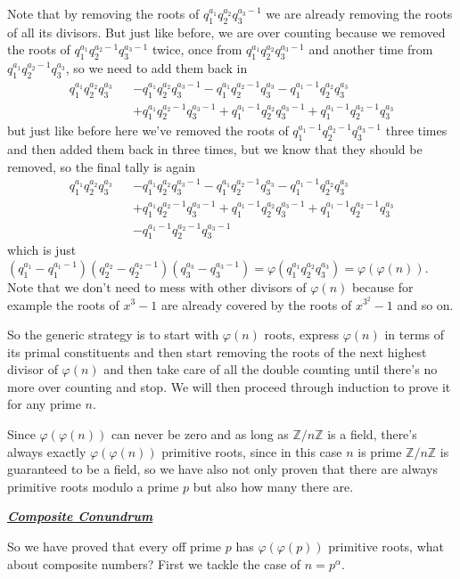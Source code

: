\documentclass[aps,preprint,preprintnumbers,nofootinbib,showpacs,prd]{revtex4-1}
\newcommand{\nbea}{\begin{eqnarray*}}
\newcommand{\neea}{\end{eqnarray*}}
\begin{document}
Note that by removing the roots of $q_1^{a_1}q_2^{a_2}q_3^{a_3-1}$ we are already removing the roots of all its divisors. But just like before, we are over counting because we removed the roots of $q_1^{a_1}q_2^{a_2-1}q_3^{a_3-1}$ twice, once from $q_1^{a_1}q_2^{a_2}q_3^{a_3-1}$ and another time from $q_1^{a_1}q_2^{a_2-1}q_3^{a_3}$, so we need to add them back in
%
\nbea
q_1^{a_1}q_2^{a_2}q_3^{a_3} &&  - q_1^{a_1}q_2^{a_2}q_3^{a_3-1} - q_1^{a_1}q_2^{a_2-1}q_3^{a_3}- q_1^{a_1-1}q_2^{a_2}q_3^{a_3} \\
&& + q_1^{a_1}q_2^{a_2-1}q_3^{a_3-1} + q_1^{a_1-1}q_2^{a_2}q_3^{a_3-1} + q_1^{a_1-1}q_2^{a_2-1}q_3^{a_3}
\neea
%
but just like before here we've removed the roots of $q_1^{a_1-1}q_2^{a_2-1}q_3^{a_3-1}$ three times and then added them back in three times, but we know that they should be removed, so the final tally is again
%
\nbea
q_1^{a_1}q_2^{a_2}q_3^{a_3} &&  - q_1^{a_1}q_2^{a_2}q_3^{a_3-1} - q_1^{a_1}q_2^{a_2-1}q_3^{a_3}- q_1^{a_1-1}q_2^{a_2}q_3^{a_3} \\
&& + q_1^{a_1}q_2^{a_2-1}q_3^{a_3-1} + q_1^{a_1-1}q_2^{a_2}q_3^{a_3-1} + q_1^{a_1-1}q_2^{a_2-1}q_3^{a_3} \\
&& -q_1^{a_1-1}q_2^{a_2-1}q_3^{a_3-1}
\neea
%
which is just $(q_1^{a_1} - q_1^{a_1-1})(q_2^{a_2}-q_2^{a_2-1})(q_3^{a_3} - q_3^{a_3-1}) =\varphi(q_1^{a_1}q_2^{a_2}q_3^{a_3}) = \varphi(\varphi(n))$. Note that we don't need to mess with other divisors of $\varphi(n)$ because for example the roots of $x^3 - 1$ are already covered by the roots of $x^{3^2} - 1$ and so on.

So the generic strategy is to start with $\varphi(n)$ roots, express $\varphi(n)$ in terms of its primal constituents and then start removing the roots of the next highest divisor of $\varphi(n)$ and then take care of all the double counting until there's no more over counting and stop. We will then proceed through induction to prove it for any prime $n$.

Since $\varphi(\varphi(n))$ can never be zero and as long as $\mathbb{Z}/n\mathbb{Z}$ is a field, there's always exactly $\varphi(\varphi(n))$ primitive roots, since in this case $n$ is prime $\mathbb{Z}/n\mathbb{Z}$ is guaranteed to be a field, so we have also not only proven that there are always primitive roots modulo a prime $p$ but also how many there are.

\bigskip
\underline{\textit{\textbf{Composite Conundrum}}}
\bigskip

So we have proved that every off prime $p$ has $\varphi(\varphi(p))$ primitive roots, what about composite numbers? First we tackle the case of $n = p^\alpha$.
\end{document}
